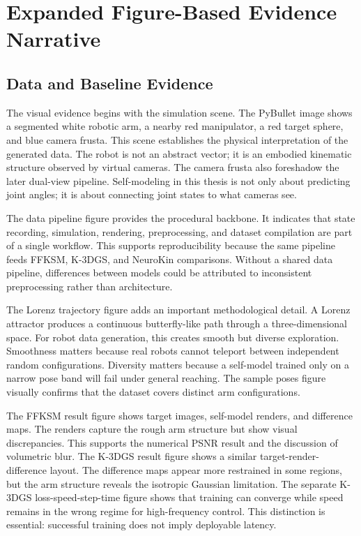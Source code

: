\documentclass[12pt,a4paper,oneside]{report}
\begin{document}
\chapter{Expanded Figure-Based Evidence Narrative}

\section{Data and Baseline Evidence}

The visual evidence begins with the simulation scene. The PyBullet image shows a segmented white robotic arm, a nearby red manipulator, a red target sphere, and blue camera frusta. This scene establishes the physical interpretation of the generated data. The robot is not an abstract vector; it is an embodied kinematic structure observed by virtual cameras. The camera frusta also foreshadow the later dual-view pipeline. Self-modeling in this thesis is not only about predicting joint angles; it is about connecting joint states to what cameras see.

The data pipeline figure provides the procedural backbone. It indicates that state recording, simulation, rendering, preprocessing, and dataset compilation are part of a single workflow. This supports reproducibility because the same pipeline feeds FFKSM, K-3DGS, and NeuroKin comparisons. Without a shared data pipeline, differences between models could be attributed to inconsistent preprocessing rather than architecture.

The Lorenz trajectory figure adds an important methodological detail. A Lorenz attractor produces a continuous butterfly-like path through a three-dimensional space. For robot data generation, this creates smooth but diverse exploration. Smoothness matters because real robots cannot teleport between independent random configurations. Diversity matters because a self-model trained only on a narrow pose band will fail under general reaching. The sample poses figure visually confirms that the dataset covers distinct arm configurations.

The FFKSM result figure shows target images, self-model renders, and difference maps. The renders capture the rough arm structure but show visual discrepancies. This supports the numerical PSNR result and the discussion of volumetric blur. The K-3DGS result figure shows a similar target-render-difference layout. The difference maps appear more restrained in some regions, but the arm structure reveals the isotropic Gaussian limitation. The separate K-3DGS loss-speed-step-time figure shows that training can converge while speed remains in the wrong regime for high-frequency control. This distinction is essential: successful training does not imply deployable latency.
\end{document}
